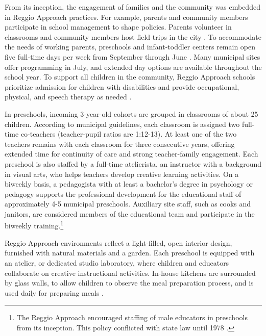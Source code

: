 From its inception, the engagement of families and the community was embedded in Reggio Approach practices. For example, parents and community members participate in school management to shape policies. Parents volunteer in classrooms and community members host field trips in the city \citep{CEHD_2016_Historical-Analysis,Cagliari-etal-eds_2016_BOOK_Loris-Malaguzzi}. To accommodate the needs of working parents, preschools and infant-toddler centers remain open five full-time days per week from September through June \citep{Giudici-Nicolosi_2014_Reggio-Approach}. Many municipal sites offer programming in July, and extended day options are available throughout the school year. To support all children in the community, Reggio Approach schools prioritize admission for children with disabilities and provide occupational, physical, and speech therapy as needed \citep{Edwards-etal-eds_1998_Hundred-Languages,Giaroni_1972_Regulations-Municipal-EC-Schools}.

In preschools, incoming 3-year-old cohorts are grouped in classrooms of about 25 children. According to municipal guidelines, each classroom is assigned two full-time co-teachers (teacher-pupil ratios are 1:12-13). At least one of the two teachers remains with each classroom for three consecutive years, offering extended time for continuity of care and strong teacher-family engagement. Each preschool is also staffed by a full-time atelierista, an instructor with a background in visual arts, who helps teachers develop creative learning activities. On a biweekly basis, a pedagogista with at least a bachelor's degree in psychology or pedagogy supports the professional development for the educational staff of approximately 4-5 municipal preschools. Auxiliary site staff, such as cooks and janitors, are considered members of the educational team and participate in the biweekly training.\footnote{The Reggio Approach encouraged staffing of male educators in preschools from its inception. This policy conflicted with state law until 1978 \citep{Hohnerlein_2015_Development-and-Diffusion}.}

Reggio Approach environments reflect a light-filled, open interior design, furnished with natural materials and a garden. Each preschool is equipped with an atelier, or dedicated studio laboratory, where children and educators collaborate on creative instructional activities. In-house kitchens are surrounded by glass walls, to allow children to observe the meal preparation process, and is used daily for preparing meals \citep{Rinaldi_2006_ReggioEmilia_BOOK,Vecchi_2010_ReggioEmilia_BOOK}.

